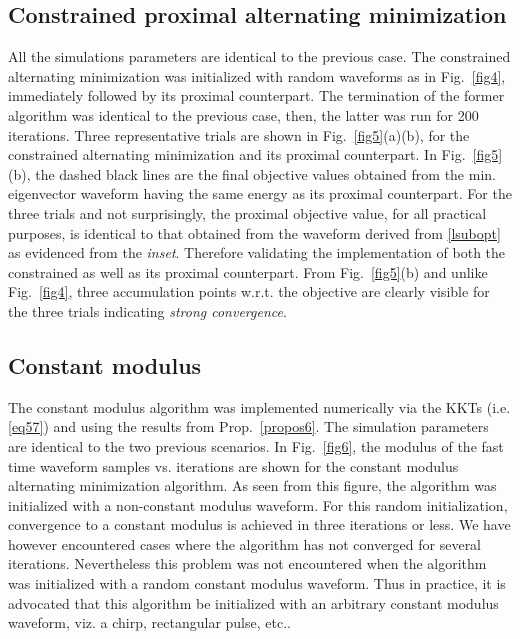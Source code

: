 \documentclass[11pt,draftclsnofoot,onecolumn]{IEEEtran}
\theoremstyle{definition}
\theoremstyle{remark}
\begin{document}
\subsection{Constrained proximal alternating minimization}
All the simulations parameters are identical to the previous case. The constrained alternating minimization was initialized with random waveforms as in Fig.~\ref{fig4}, immediately followed by its proximal counterpart. The termination of the former algorithm was identical to the previous case, then, the latter was run for 200 iterations. Three representative trials are shown in Fig.~\ref{fig5}(a)(b), for the constrained alternating minimization and its proximal counterpart. In Fig.~\ref{fig5}(b), the dashed black lines are the final objective values obtained from the min. eigenvector waveform having the same energy as its proximal counterpart. For the three trials and not surprisingly, the proximal objective value, for all practical purposes, is identical to that obtained from the waveform derived from \eqref{lsubopt} as evidenced from the {\it inset}. Therefore validating the implementation of both the constrained as well as its proximal counterpart. From Fig.~\ref{fig5}(b) and unlike Fig.~\ref{fig4}, three accumulation points w.r.t. the objective are clearly visible for the three trials indicating {\it strong convergence}. 
\subsection{Constant modulus}
The constant modulus algorithm was implemented numerically via the KKTs (i.e. \eqref{eq57}) and using the results from Prop.~\ref{propos6}. The simulation parameters are identical to the two previous scenarios. In Fig.~\ref{fig6}, the modulus of the fast time waveform samples vs. iterations are shown for the constant modulus alternating minimization algorithm. As seen from this figure, the algorithm was initialized with a non-constant modulus waveform. For this random initialization, convergence to a constant modulus is achieved in three iterations or less. We have however encountered cases where the algorithm has not converged for several iterations. Nevertheless this problem was not encountered when the algorithm was initialized with  a random constant modulus waveform. Thus in practice, it is advocated that this algorithm be initialized with  an arbitrary constant modulus waveform, viz. a chirp, rectangular pulse, etc..
\end{document}
